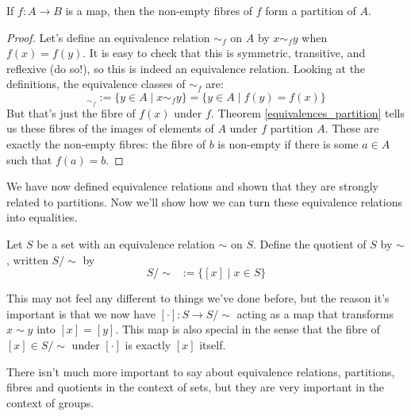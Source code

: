 \begin{corollary}
    If $f \colon A \to B$ is a map, then the non-empty fibres of $f$ form a partition of $A$.
\end{corollary}
\begin{proof}
    Let's define an equivalence relation $\sim_f$ on $A$ by $x \sim_f y$ when $f(x) = f(y)$.
    It is easy to check that this is symmetric, transitive, and reflexive (do so!), so this is indeed an equivalence relation.
    Looking at the definitions, the equivalence classes of $\sim_f$ are:
    \begin{equation*}
        [x]_{\sim_f} := \{ y \in A \mid x \sim_f y \} = \{ y \in A \mid f(y) = f(x) \}
    \end{equation*}
    But that's just the fibre of $f(x)$ under $f$.
    Theorem \ref{equivalences_partition} tells us these fibres of the images of elements of $A$ under $f$ partition $A$. These are exactly the non-empty fibres: the fibre of $b$ is non-empty if there is some $a \in A$ such that $f(a) = b$.
\end{proof}

\noindent
We have now defined equivalence relations and shown that they are strongly related to partitions. Now we'll show how we can turn these equivalence relations into equalities.

\begin{definition}[Quotients]
    Let $S$ be a set with an equivalence relation $\sim$ on $S$. Define the quotient of $S$ by $\sim$, written $S/\sim$ by
    \begin{equation*}
        S/\sim \;\;:= \{[x] \mid x \in S \}
    \end{equation*}
\end{definition}
\begin{remark}
    This may not feel any different to things we've done before, but the reason it's important is that we now have $[\cdot] \colon S \to S/\sim$ acting as a map that transforms $x \sim y$ into $[x] = [y]$. This map is also special in the sense that the fibre of $[x] \in S/\sim$ under $[\cdot]$ is exactly $[x]$ itself.
\end{remark}
\noindent
There isn't much more important to say about equivalence relations, partitions, fibres and quotients in the context of sets, but they are very important in the context of groups.